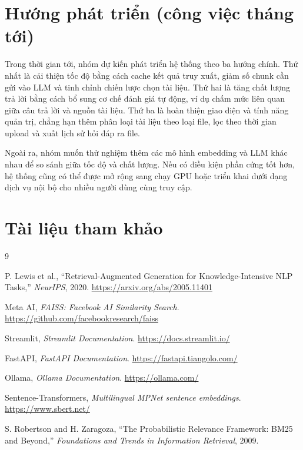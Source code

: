 \documentclass[10pt, conference, a4paper]{IEEEtran}
\begin{document}
\section{Hướng phát triển (công việc tháng tới)}
Trong thời gian tới, nhóm dự kiến phát triển hệ thống theo ba hướng chính. Thứ nhất là cải thiện tốc độ bằng cách cache kết quả truy xuất, giảm số chunk cần gửi vào LLM và tinh chỉnh chiến lược chọn tài liệu. Thứ hai là tăng chất lượng trả lời bằng cách bổ sung cơ chế đánh giá tự động, ví dụ chấm mức liên quan giữa câu trả lời và nguồn tài liệu. Thứ ba là hoàn thiện giao diện và tính năng quản trị, chẳng hạn thêm phân loại tài liệu theo loại file, lọc theo thời gian upload và xuất lịch sử hỏi đáp ra file.

Ngoài ra, nhóm muốn thử nghiệm thêm các mô hình embedding và LLM khác nhau để so sánh giữa tốc độ và chất lượng. Nếu có điều kiện phần cứng tốt hơn, hệ thống cũng có thể được mở rộng sang chạy GPU hoặc triển khai dưới dạng dịch vụ nội bộ cho nhiều người dùng cùng truy cập.

\section{Tài liệu tham khảo}
\begin{thebibliography}{9}

P. Lewis et al., ``Retrieval-Augmented Generation for Knowledge-Intensive NLP Tasks,'' \emph{NeurIPS}, 2020. \url{https://arxiv.org/abs/2005.11401}

Meta AI, \emph{FAISS: Facebook AI Similarity Search}. \url{https://github.com/facebookresearch/faiss}

Streamlit, \emph{Streamlit Documentation}. \url{https://docs.streamlit.io/}

FastAPI, \emph{FastAPI Documentation}. \url{https://fastapi.tiangolo.com/}

Ollama, \emph{Ollama Documentation}. \url{https://ollama.com/}

Sentence-Transformers, \emph{Multilingual MPNet sentence embeddings}. \url{https://www.sbert.net/}

S. Robertson and H. Zaragoza, ``The Probabilistic Relevance Framework: BM25 and Beyond,'' \emph{Foundations and Trends in Information Retrieval}, 2009.

\end{thebibliography}
\end{document}
